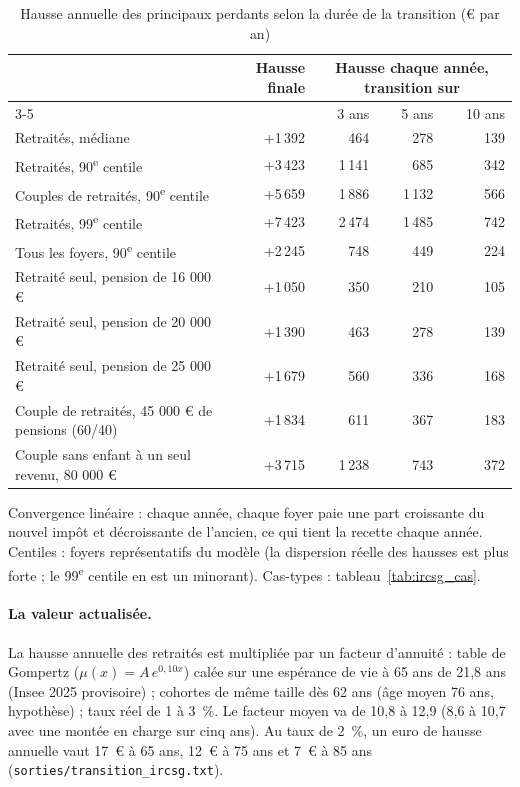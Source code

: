 \documentclass[11pt,a4paper]{article}
\begin{document}
\begin{table}[!htbp]\centering\scriptsize\setlength{\tabcolsep}{4pt}
\caption{Hausse annuelle des principaux perdants selon la durée de la transition (€ par an)}\label{tab:ircsg_trans}
\begin{tabular}{@{}lrrrr@{}}
\toprule
& Hausse finale & \multicolumn{3}{c}{Hausse chaque année, transition sur} \\ \cmidrule(l){3-5}
& & 3 ans & 5 ans & 10 ans \\
\midrule
Retraités, médiane & +1\,392 & 464 & 278 & 139 \\
Retraités, 90\textsuperscript{e} centile & +3\,423 & 1\,141 & 685 & 342 \\
Couples de retraités, 90\textsuperscript{e} centile & +5\,659 & 1\,886 & 1\,132 & 566 \\
Retraités, 99\textsuperscript{e} centile & +7\,423 & 2\,474 & 1\,485 & 742 \\
Tous les foyers, 90\textsuperscript{e} centile & +2\,245 & 748 & 449 & 224 \\
Retraité seul, pension de 16 000 € & +1\,050 & 350 & 210 & 105 \\
Retraité seul, pension de 20 000 € & +1\,390 & 463 & 278 & 139 \\
Retraité seul, pension de 25 000 € & +1\,679 & 560 & 336 & 168 \\
Couple de retraités, 45 000 € de pensions (60/40) & +1\,834 & 611 & 367 & 183 \\
Couple sans enfant à un seul revenu, 80 000 € & +3\,715 & 1\,238 & 743 & 372 \\
\bottomrule
\end{tabular}
\par\vspace{3pt}\parbox{\linewidth}{\raggedright\scriptsize\color{encre}
Convergence linéaire : chaque année, chaque foyer paie une part croissante du nouvel impôt et décroissante de l'ancien, ce qui tient la recette chaque année. Centiles : foyers représentatifs du modèle (la dispersion réelle des hausses est plus forte ; le 99\textsuperscript{e} centile en est un minorant). Cas-types : tableau~\ref{tab:ircsg_cas}.}
\end{table}


\paragraph{La valeur actualisée.} La hausse annuelle des retraités est multipliée par un facteur d'annuité : table de
Gompertz ($\mu(x) = A\,e^{0,10x}$) calée sur une espérance de vie à 65 ans de 21,8 ans (Insee 2025 provisoire) ;
cohortes de même taille dès 62 ans (âge moyen 76 ans, hypothèse) ; taux réel de 1 à 3~\%. Le facteur moyen va de 10,8 à
12,9 (8,6 à 10,7 avec une montée en charge sur cinq ans). Au taux de 2~\%, un euro de hausse annuelle vaut 17~€ à 65
ans, 12~€ à 75 ans et 7~€ à 85 ans (\texttt{sorties/transition\_ircsg.txt}).
\end{document}

